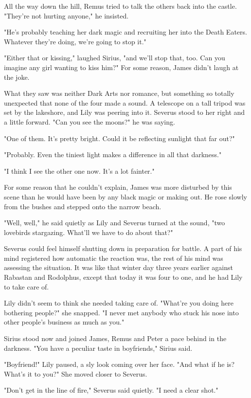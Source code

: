 All the way down the hill, Remus tried to talk the others back into the castle. "They're not hurting anyone," he insisted.

"He's probably teaching her dark magic and recruiting her into the Death Eaters. Whatever they're doing, we're going to stop it."

"Either that or kissing," laughed Sirius, "and we'll stop that, too. Can you imagine any girl wanting to kiss him?" For some reason, James didn't laugh at the joke.

What they saw was neither Dark Arts nor romance, but something so totally unexpected that none of the four made a sound. A telescope on a tall tripod was set by the lakeshore, and Lily was peering into it. Severus stood to her right and a little forward. "Can you see the moons?" he was saying.

"One of them. It's pretty bright. Could it be reflecting sunlight that far out?"

"Probably. Even the tiniest light makes a difference in all that darkness."

"I think I see the other one now. It's a lot fainter."

For some reason that he couldn't explain, James was more disturbed by this scene than he would have been by any black magic or making out. He rose slowly from the bushes and stepped onto the narrow beach.

"Well, well," he said quietly as Lily and Severus turned at the sound, "two lovebirds stargazing. What'll we have to do about that?"

Severus could feel himself shutting down in preparation for battle. A part of his mind registered how automatic the reaction was, the rest of his mind was assessing the situation. It was like that winter day three years earlier against Rabastan and Rodolphus, except that today it was four to one, and he had Lily to take care of.

Lily didn't seem to think she needed taking care of. "What're you doing here bothering people?" she snapped. "I never met anybody who stuck his nose into other people's business as much as you."

Sirius stood now and joined James, Remus and Peter a pace behind in the darkness. "You have a peculiar taste in boyfriends," Sirius said.

"Boyfriend!" Lily paused, a sly look coming over her face. "And what if he is? What's it to you?" She moved closer to Severus.

"Don't get in the line of fire," Severus said quietly. "I need a clear shot."

